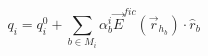 \documentclass[12pt]{article}
\begin{document}
$$
  q_{i} = q_{i}^{0} + \sum_{b \in M_{i}} \alpha_{b}^{i}
  \vec{E}^{fic} \left( \vec{r}_{h_{b}} \right) \cdot \hat{r}_{b}
$$
\end{document}
